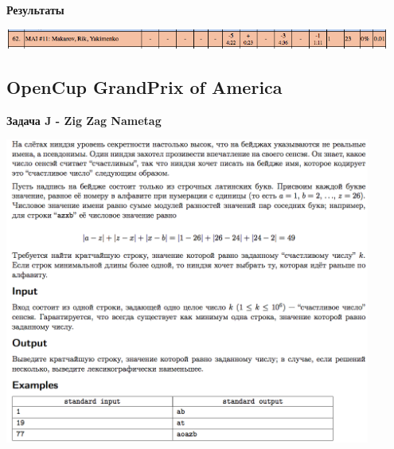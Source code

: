 \documentclass[a4paper,12pt]{article}
\begin{document}
\textbf{{\large Результаты}} \\
\begin{center}
\includegraphics[width=0.95\textwidth]{OC_Tatarstan/OC_Tatarstan_result.png}\\ [1cm]
\end{center}



%
%
\newpage
\subsection{OpenCup GrandPrix of America}

\textbf{{\large Задача J - Zig Zag Nametag}} \\
\begin{center}
\includegraphics[width=0.9\textwidth]{OC_America/OC_America_J.png}\\ [1cm]
\end{center}
\newpage
\end{document}
